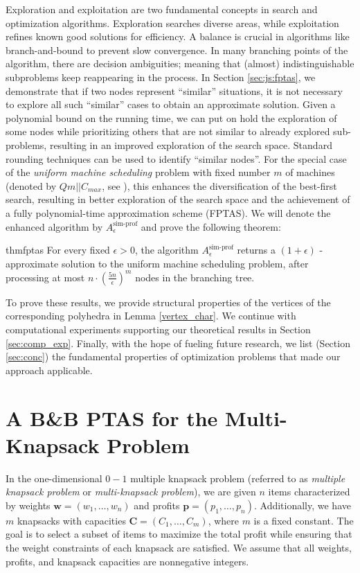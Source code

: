 \documentclass[a4paper,UKenglish,cleveref, autoref, thm-restate, pdfa]{lipics-v2021}
\theoremstyle{plain}
\begin{document}
Exploration and exploitation are two fundamental concepts in search and optimization algorithms. Exploration searches diverse areas, while exploitation refines known good solutions for efficiency. A balance is crucial in algorithms like branch-and-bound to prevent slow convergence. In many branching points of the algorithm, there are decision ambiguities; meaning that (almost) indistinguishable subproblems keep reappearing in the process. In Section \ref{sec:js:fptas}, we demonstrate that if two nodes represent ``similar'' situations, it is not necessary to explore all such ``similar'' cases to obtain an approximate solution. Given a polynomial bound on the running time, we can put on hold the exploration of some nodes while prioritizing others that are not similar to already explored sub-problems, resulting in an improved exploration of the search space. Standard rounding techniques can be used to identify ``similar nodes''. For the special case of the \emph{uniform machine scheduling} problem with fixed number $m$ of machines (denoted by $Qm||C_{max}$, see \cite{machine_scheduling_review}), this enhances the diversification of the best-first search, resulting in better exploration of the search space and the achievement of a fully polynomial-time approximation scheme (FPTAS). We will denote the enhanced algorithm by $A^{\text{sim-prof}}_{\epsilon}$ and prove the following theorem:

\begin{restatable*}{thm}{fptas}\label{fptas}
    For every fixed $\epsilon > 0$, the algorithm $A^{\text{sim-prof}}_{\epsilon}$ returns a $(1+\epsilon)$ - approximate solution to the uniform machine scheduling problem, after processing at most $n\cdot \left(\frac{5n}{\epsilon}\right)^m$ nodes in the branching tree.
\end{restatable*}

To prove these results, we provide structural properties of the vertices of the corresponding polyhedra in Lemma \ref{vertex_char}. We continue with computational experiments supporting our theoretical results in Section \ref{sec:comp_exp}. Finally, with the hope of fueling future research, we list (Section \ref{sec:conc}) the fundamental properties of optimization problems that made our approach applicable. 
\section{A B\&B PTAS for the Multi-Knapsack Problem}\label{sec:knap}

In the one-dimensional $0-1$ multiple knapsack problem (referred to as \emph{multiple knapsack problem} or \emph{multi-knapsack problem}), we are given $n$ items characterized by weights $\bm{w} = (w_1, \ldots, w_n)$ and  profits $\bm{p} = (p_1, \ldots, p_n)$. Additionally, we have \( m \) knapsacks with capacities \( \bm{C} = (C_1, \ldots, C_m) \), where \( m \) is a fixed constant. The goal is to select a subset of items to maximize the total profit while ensuring that the weight constraints of each knapsack are satisfied. We assume that all weights, profits, and knapsack capacities are nonnegative integers.  
\end{document}
